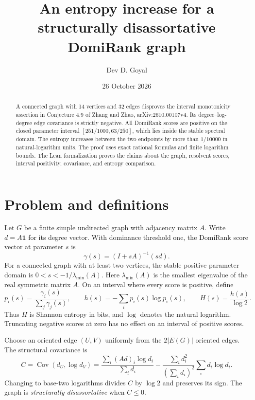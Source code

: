 \documentclass[11pt,a4paper]{article}
\title{An entropy increase for a structurally disassortative DomiRank graph}
\author{Dev D. Goyal}
\date{26 October 2026}
\newcommand{\one}{\mathbf 1}
\begin{document}
\maketitle
\begin{abstract}
A connected graph with 14 vertices and 32 edges disproves the interval
monotonicity assertion in Conjecture 4.9 of Zhang and Zhao,
arXiv:2610.00107v4. Its degree--log-degree edge covariance is strictly
negative. All DomiRank scores are positive on the closed parameter interval
$[251/1000,63/250]$, which lies inside the stable spectral domain.
The entropy increases between the two endpoints by more than $1/10000$
in natural-logarithm units.
The proof uses exact rational formulas and finite logarithm bounds.
The Lean formalization proves the claims about the graph, resolvent scores,
interval positivity, covariance, and entropy comparison.
\end{abstract}

\section{Problem and definitions}
Let $G$ be a finite simple undirected graph with adjacency matrix $A$.
Write $d=A\one$ for its degree vector. With dominance threshold one,
the DomiRank score vector at parameter $s$ is
\begin{equation}\label{eq:gamma}
 \gamma(s)=(I+sA)^{-1}(sd).
\end{equation}
For a connected graph with at least two vertices, the stable positive
parameter domain is $0<s<-1/\lambda_{\min}(A)$.
Here $\lambda_{\min}(A)$ is the smallest eigenvalue of the real symmetric
matrix $A$. On an interval where every score is positive, define
\[
 p_i(s)=\frac{\gamma_i(s)}{\sum_j\gamma_j(s)},\qquad
 h(s)=-\sum_i p_i(s)\log p_i(s),\qquad H(s)=\frac{h(s)}{\log 2}.
\]
Thus $H$ is Shannon entropy in bits, and $\log$ denotes the natural logarithm.
Truncating negative scores at zero has no effect on an interval of positive scores.

Choose an oriented edge $(U,V)$ uniformly from the $2|E(G)|$ oriented
edges. The structural covariance is
\begin{equation}\label{eq:cov}
 C=\operatorname{Cov}(d_U,\log d_V)
 =\frac{\sum_i(Ad)_i\log d_i}{\sum_i d_i}
 -\frac{\sum_i d_i^2}{(\sum_i d_i)^2}\sum_i d_i\log d_i.
\end{equation}
Changing to base-two logarithms divides $C$ by $\log 2$ and preserves its sign.
The graph is \emph{structurally disassortative} when $C\leq0$.
\end{document}

